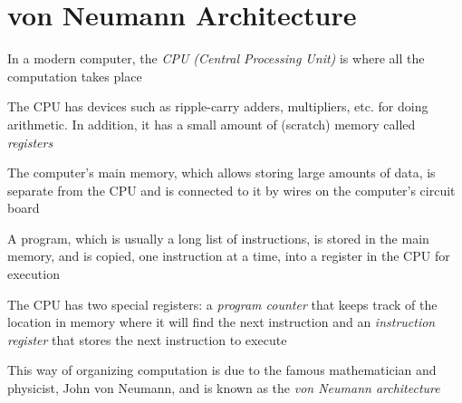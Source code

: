 \documentclass[8pt,a4paper,compress]{beamer}
\begin{document}
\section{von Neumann Architecture}
\begin{frame}[fragile]
In a modern computer, the \emph{CPU (Central Processing Unit)} is where all the computation takes place

\bigskip

The CPU has devices such as ripple-carry adders, multipliers, etc. for doing arithmetic. In addition, it has a small amount of (scratch) memory called \emph{registers}

\bigskip

The computer's main memory, which allows storing large amounts of data, is separate from the CPU and is connected to it by wires on the computer's circuit board

\bigskip

A program, which is usually a long list of instructions, is stored in the main memory, and is copied, one instruction at a time, into a register in the CPU for execution

\bigskip

The CPU has two special registers: a \emph{program counter} that keeps track of the location in memory where it will find the next instruction and an \emph{instruction register} that stores the next instruction to execute

\bigskip

This way of organizing computation is due to the famous mathematician and physicist, John von Neumann, and is known as the \emph{von Neumann architecture}
\end{frame}
\end{document}
